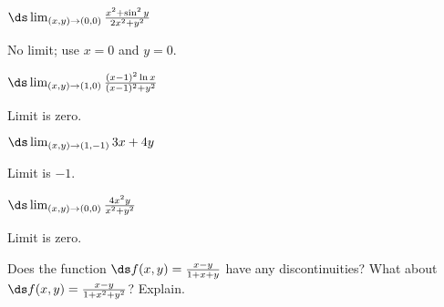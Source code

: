 \begin{enumialphparenastyle}
\begin{ex}
$\ds\lim_{(x,y)\to(0,0)}{x^2 + \sin^2 y\over 2x^2+y^2}$
\begin{sol}
No limit; use $x=0$ and $y=0$.
\end{sol}
\end{ex}

\begin{ex}
$\ds\lim_{(x,y)\to(1,0)}{(x-1)^2\ln x\over(x-1)^2+y^2}$
\begin{sol}
Limit is zero.
\end{sol}
\end{ex}

\begin{ex}
$\ds\lim_{(x,y)\to(1,-1)}{3x+4y}$
\begin{sol}
Limit is $-1$.
\end{sol}
\end{ex}

\begin{ex}
$\ds\lim_{(x,y)\to(0,0)}{4x^2y\over x^2+y^2}$
\begin{sol}
Limit is zero.
\end{sol}
\end{ex}

\begin{ex}
Does the function $\ds f(x,y)={x-y\over 1+x+y}$ 
have any discontinuities?  What about 
$\ds f(x,y)={x-y\over 1+x^2+y^2}$?  Explain.
\end{ex}

\end{enumialphparenastyle}
